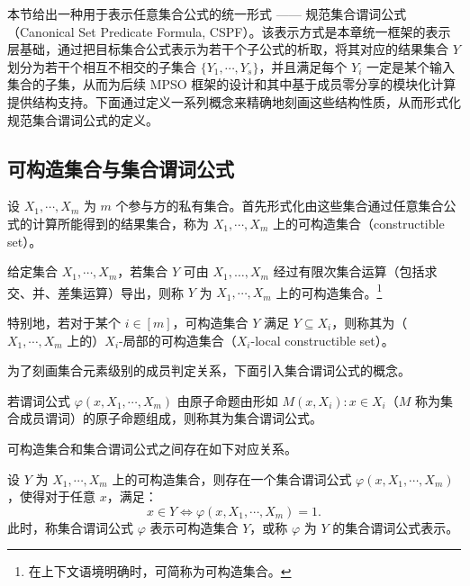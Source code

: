 本节给出一种用于表示任意集合公式的统一形式 —— 规范集合谓词公式（Canonical Set Predicate Formula, CSPF）。该表示方式是本章统一框架的表示层基础，通过把目标集合公式表示为若干个子公式的析取，将其对应的结果集合 $Y$ 划分为若干个相互不相交的子集合 $\{Y_1, \cdots, Y_s\}$，并且满足每个 $Y_i$ 一定是某个输入集合的子集，从而为后续 MPSO 框架的设计和其中基于成员零分享的模块化计算提供结构支持。下面通过定义一系列概念来精确地刻画这些结构性质，从而形式化规范集合谓词公式的定义。

\subsection{可构造集合与集合谓词公式}

设 $X_1,\cdots,X_m$ 为 $m$ 个参与方的私有集合。首先形式化由这些集合通过任意集合公式的计算所能得到的结果集合，称为 $X_1, \cdots, X_m$ 上的可构造集合（constructible set）。

\begin{definition}[可构造集合]
给定集合 $X_1,\cdots,X_m$，若集合 $Y$ 可由 $X_1, \dots, X_m$ 经过有限次集合运算（包括求交、并、差集运算）导出，则称 $Y$ 为 $X_1, \cdots, X_m$ 上的可构造集合。\footnote{在上下文语境明确时，可简称为可构造集合。}
\end{definition}

特别地，若对于某个 $i \in [m]$，可构造集合 $Y$ 满足 $Y \subseteq X_i$，则称其为（$X_1, \cdots, X_m$ 上的）$X_i$-局部的可构造集合（$X_i$-local constructible set）。

为了刻画集合元素级别的成员判定关系，下面引入集合谓词公式的概念。

\begin{definition}[集合谓词公式]
若谓词公式 $\varphi(x,X_1,\cdots,X_m)$ 由原子命题由形如 $M(x, X_i): x \in X_i$（$M$ 称为集合成员谓词）的原子命题组成，则称其为集合谓词公式。
\end{definition}

可构造集合和集合谓词公式之间存在如下对应关系。

\begin{theorem}\label{theorem:set1}
设 $Y$ 为 $X_1,\cdots,X_m$ 上的可构造集合，则存在一个集合谓词公式 $\varphi(x, X_1, \cdots, X_m)$，使得对于任意 $x$，满足：
$$x \in Y \iff \varphi(x, X_1, \cdots, X_m) = 1.$$
此时，称集合谓词公式 $\varphi$ 表示可构造集合 $Y$，或称 $\varphi$ 为 $Y$ 的集合谓词公式表示。
\end{theorem}

